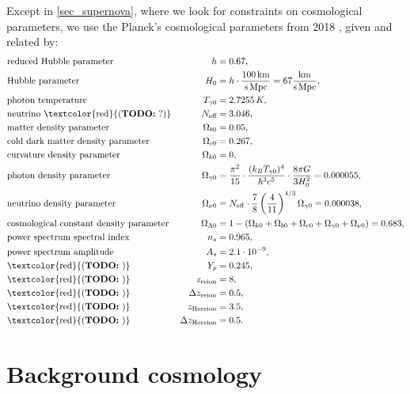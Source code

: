 \documentclass[10pt,a4paper]{article}
\newcommand\TODO[1]{\textcolor{red}{(\textbf{TODO:} #1)}}
\begin{document}
Except in \cref{sec_supernova}, where we look for constraints on cosmological parameters, we use the Planck's cosmological parameters from 2018 \cite{planckcollaborationPlanck2018Results2020},
given and related by:
\begin{equation}
\begin{aligned}
	& \text{reduced Hubble parameter} & h &= 0.67, \\
	& \text{Hubble parameter} & H_0 &= h \cdot \frac{100\,\mathrm{km}}{\mathrm{s}\,\mathrm{Mpc}} = 67 \frac{\mathrm{km}}{\mathrm{s}\,\mathrm{Mpc}}, \\
	& \text{photon temperature} & T_{\gamma0} &= 2.7255\,K, \\
	& \text{neutrino \TODO{?}} & N_\text{eff} &= 3.046, \\
	& \text{matter density parameter} & \Omega_{b0} &= 0.05, \\
	& \text{cold dark matter density parameter} & \Omega_{c0} &= 0.267,\\
	& \text{curvature density parameter} & \Omega_{k0} &= 0, \\
	& \text{photon density parameter} & \Omega_{\gamma0} &= \frac{\pi^2}{15} \cdot \frac{(k_B T_{\gamma0})^4}{\hbar^3 c^5} \cdot \frac{8 \pi G}{3 H_0^2} = 0.000055, \\
	& \text{neutrino density parameter} & \Omega_{\nu0} &= N_{\rm eff}\cdot \frac{7}{8}\left(\frac{4}{11}\right)^{4/3}\Omega_{\gamma 0} = 0.000038, \\
	& \text{cosmological constant density parameter} & \Omega_{\Lambda 0} &= 1 - (\Omega_{k 0}+\Omega_{b 0}+\Omega_{c0}+\Omega_{\gamma 0}+\Omega_{\nu 0}) = 0.683,\\
	& \text{power spectrum spectral index} & n_s &= 0.965, \\
	& \text{power spectrum amplitude} & A_s &= 2.1\cdot 10^{-9}, \\
	& \text{\TODO{}} & Y_p &= 0.245, \\
	& \text{\TODO{}} & z_{\rm reion} &= 8, \\
	& \text{\TODO{}} & \Delta z_{\rm reion} &= 0.5, \\
	& \text{\TODO{}} & z_{\rm He reion} &= 3.5, \\
	& \text{\TODO{}} & \Delta z_{\rm He reion} &= 0.5.
\end{aligned}
\label{eq_planck2018}
\end{equation}


\section{Background cosmology}
\label{sec_background_cosmology}
\end{document}
